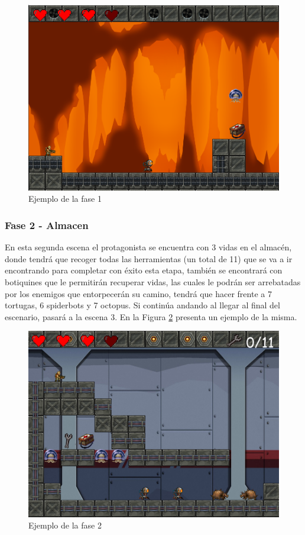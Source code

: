 \begin{figure}[H]
	\centering
	\includegraphics[scale=0.50]{imagenes/EjemploEscena_1.png}
	\caption{\label{fig:EjemploEscena_1}Ejemplo de la fase 1}
\end{figure}

\subsubsection{Fase 2 - Almacen}
En esta segunda escena el protagonista se encuentra con 3 vidas en el almacén, donde tendrá que recoger todas las herramientas (un total de 11) que se va a ir encontrando para completar con éxito esta etapa, también se encontrará con botiquines que le permitirán recuperar vidas, las cuales le podrán ser arrebatadas por los enemigos que entorpecerán su camino, tendrá que hacer frente a 7 tortugas, 6 spiderbots y 7 octopus. Si continúa andando al llegar al final del escenario, pasará a la escena 3. En la Figura \ref{fig:EjemploEscena_2} presenta un ejemplo de la misma. 

\begin{figure}[H]
    \centering
    \includegraphics[scale=0.50]{imagenes/EjemploEscena_2.png}
    \caption{\label{fig:EjemploEscena_2}Ejemplo de la fase 2}
\end{figure}
